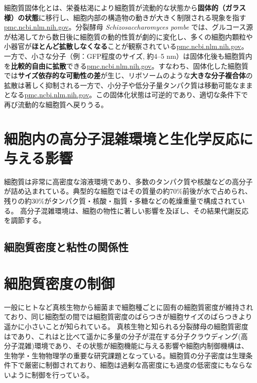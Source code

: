 細胞質固体化とは、栄養枯渇により細胞質が流動的な状態から\textbf{固体的（ガラス様）の状態}に移行し、細胞内部の構造物の動きが大きく制限される現象を指す\href{https://pmc.ncbi.nlm.nih.gov/articles/PMC6857596/\#:~:text=run\%20out\%20of\%20nutrients,2016\%20\%3B\%20\%2043}{pmc.ncbi.nlm.nih.gov}。分裂酵母 \textit{Schizosaccharomyces pombe} では、グルコース源が枯渇してから数日後に細胞質の動的性質が劇的に変化し、多くの細胞内顆粒や小器官が\textbf{ほとんど拡散しなくなる}ことが観察されている\href{https://pmc.ncbi.nlm.nih.gov/articles/PMC6857596/\#:~:text=run\%20out\%20of\%20nutrients,2016\%20\%3B\%20\%2043}{pmc.ncbi.nlm.nih.gov}。一方で、小さな分子（例：GFP程度のサイズ, 約4–5 nm）は固体化後も細胞質内を\textbf{比較的自由に拡散}できる\href{https://pmc.ncbi.nlm.nih.gov/articles/PMC6857596/\#:~:text=run\%20out\%20of\%20nutrients,2016\%20\%3B\%20\%2043}{pmc.ncbi.nlm.nih.gov}。すなわち、固体化した細胞質では\textbf{サイズ依存的な可動性の差}が生じ、リボソームのような\textbf{大きな分子複合体}の拡散は著しく抑制される一方で、小分子や低分子量タンパク質は移動可能なままとなる\href{https://pmc.ncbi.nlm.nih.gov/articles/PMC11214080/\#:~:text=spores\%20and\%20uncovered\%20signaling\%20pathways,such\%20as\%20ribosomes\%2C\%20is\%20restricted}{pmc.ncbi.nlm.nih.gov}。この固体化状態は可逆的であり、適切な条件下で再び流動的な細胞質へ戻りうる。

\section{細胞内の高分子混雑環境と生化学反応に与える影響}
細胞質は非常に高密度な溶液環境であり、多数のタンパク質や核酸などの高分子が詰め込まれている。典型的な細胞ではその質量の約70\%前後が水で占められ、残りの約30\%がタンパク質・核酸・脂質・多糖などの乾燥重量で構成されている。\cite{monterroso2024macromolecular}
高分子混雑環境は、細胞の物性に著しい影響を及ぼし、その結果代謝反応を調節する。
\subsection{細胞質密度と粘性の関係性}
\section{細胞質密度の制御}
一般にヒトなど真核生物から細菌まで細胞種ごとに固有の細胞質密度が維持されており、同じ細胞型の間では細胞質密度のばらつきが細胞サイズのばらつきより遥かに小さいことが知られている。\cite{neurohr2020relevance}
真核生物と知られる分裂酵母の細胞質密度はであり、これはと比べて遥かに多量の分子が混在する分子クラウディング(高分子混雑)環境であり、その状態が細胞機能に与える影響や細胞内制御機構は、生物学・生物物理学の重要な研究課題となっている。細胞質の分子密度は生理条件下で厳密に制御されており、細胞は過剰な高密度にも過度の低密度にもならないように制御を行っている。
